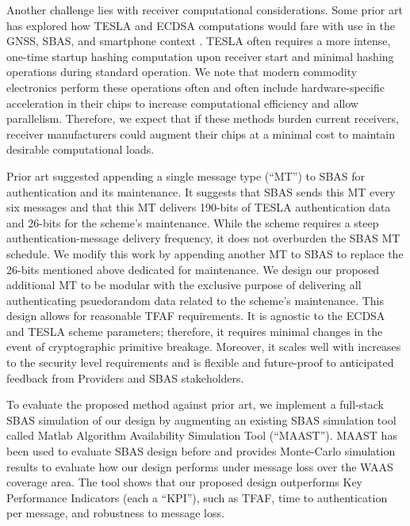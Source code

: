 \documentclass[letterpaper,times]{IONconf/IONconf}
\begin{document}
	Another challenge lies with receiver computational considerations.
	Some prior art has explored how TESLA and ECDSA computations would fare with use in the GNSS, SBAS, and smartphone context \cite{tesla-cpus}.
	TESLA often requires a more intense, one-time startup hashing computation upon receiver start and minimal hashing operations during standard operation.
	We note that modern commodity electronics perform these operations often and often include hardware-specific acceleration in their chips to increase computational efficiency and allow parallelism.
	Therefore, we expect that if these methods burden current receivers, receiver manufacturers could augment their chips at a minimal cost to maintain desirable computational loads.

	Prior art suggested appending a single message type (``MT'') to SBAS for authentication and its maintenance\cite{Neish_Dissertation}.
	It suggests that SBAS sends this MT every six messages and that this MT delivers 190-bits of TESLA authentication data and 26-bits for the scheme's maintenance.
	While the scheme requires a steep authentication-message delivery frequency, it does not overburden the SBAS MT schedule.
	We modify this work by appending another MT to SBAS to replace the 26-bits mentioned above dedicated for maintenance.
	We design our proposed additional MT to be modular with the exclusive purpose of delivering all authenticating psuedorandom data related to the scheme's maintenance.
	This design allows for reasonable TFAF requirements.
	It is agnostic to the ECDSA and TESLA scheme parameters; therefore, it requires minimal changes in the event of cryptographic primitive breakage.
	Moreover, it scales well with increases to the security level requirements and is flexible and future-proof to anticipated feedback from Providers and SBAS stakeholders.

	To evaluate the proposed method against prior art, we implement a full-stack SBAS simulation of our design by augmenting an existing SBAS simulation tool called Matlab Algorithm Availability Simulation Tool (``MAAST'')\cite{MAAST}.
	MAAST has been used to evaluate SBAS design before and provides Monte-Carlo simulation results to evaluate how our design performs under message loss over the WAAS coverage area.
	The tool shows that our proposed design outperforms Key Performance Indicators (each a ``KPI''), such as TFAF, time to authentication per message, and robustness to message loss.
\end{document}
